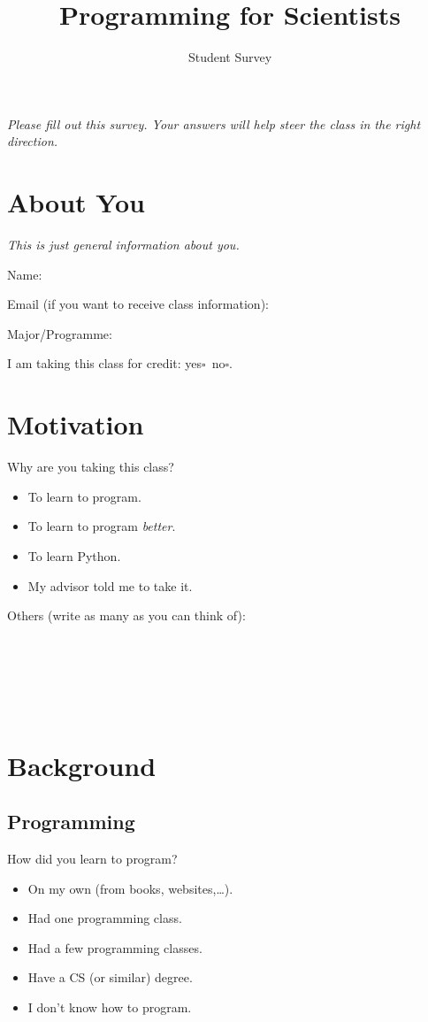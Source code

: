 \documentclass[article,twoside]{memoir}
\author{Student Survey}
\title{Programming for Scientists}
\newcommand*{\fillunderscore}{~\hrulefill}
\newcommand*{\checkbox}{$\square$}
\newcommand*{\yesno}{\hfill\mbox{yes\checkbox~no\checkbox}}
\newcommand{\header}[1]{\textsl{#1}\par\medskip}
\begin{document}
\maketitle
\header{Please fill out this survey. Your answers will help steer the class in the right direction.}

\chapter{About You}

\header{This is just general information about you.}

Name: \fillunderscore

Email (if you want to receive class information): \fillunderscore

Major/Programme: \fillunderscore

I am taking this class for credit: \yesno.

\chapter{Motivation}

Why are you taking this class?
\begin{itemize}[\checkbox]
\item To learn to program.
\item To learn to program \emph{better}.
\item To learn Python.
\item My advisor told me to take it.
\end{itemize}

Others (write as many as you can think of): \fillunderscore\par\smallskip
\fillunderscore\par\smallskip
\fillunderscore\par\smallskip
\fillunderscore

\chapter{Background}

\section{Programming}

How did you learn to program?
\begin{itemize}[\checkbox]
\item On my own (from books, websites,\dots).
\item Had one programming class.
\item Had a few programming classes.
\item Have a CS (or similar) degree.
\item I don't know how to program.
\end{itemize}
\end{document}
